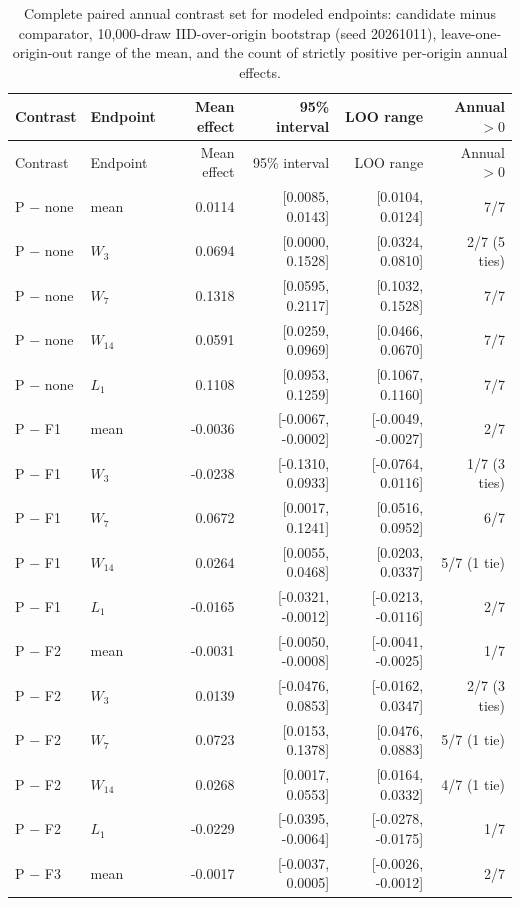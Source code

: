 {\scriptsize
\begin{longtable}{@{}llrrrr@{}}
\caption{Complete paired annual contrast set for modeled endpoints: candidate minus comparator, 10{,}000-draw IID-over-origin bootstrap (seed 20261011), leave-one-origin-out range of the mean, and the count of strictly positive per-origin annual effects.}\label{sup:r2-contrasts}\\
\toprule
Contrast & Endpoint & Mean effect & 95\% interval & LOO range & Annual $>0$ \\
\midrule
\endfirsthead
\toprule
Contrast & Endpoint & Mean effect & 95\% interval & LOO range & Annual $>0$ \\
\midrule
\endhead
\bottomrule
\endlastfoot
P $-$ none & mean & 0.0114 & [0.0085, 0.0143] & [0.0104, 0.0124] & 7/7 \\
P $-$ none & $W_3$ & 0.0694 & [0.0000, 0.1528] & [0.0324, 0.0810] & 2/7 (5 ties) \\
P $-$ none & $W_7$ & 0.1318 & [0.0595, 0.2117] & [0.1032, 0.1528] & 7/7 \\
P $-$ none & $W_{14}$ & 0.0591 & [0.0259, 0.0969] & [0.0466, 0.0670] & 7/7 \\
P $-$ none & $L_1$ & 0.1108 & [0.0953, 0.1259] & [0.1067, 0.1160] & 7/7 \\
P $-$ F1 & mean & -0.0036 & [-0.0067, -0.0002] & [-0.0049, -0.0027] & 2/7 \\
P $-$ F1 & $W_3$ & -0.0238 & [-0.1310, 0.0933] & [-0.0764, 0.0116] & 1/7 (3 ties) \\
P $-$ F1 & $W_7$ & 0.0672 & [0.0017, 0.1241] & [0.0516, 0.0952] & 6/7 \\
P $-$ F1 & $W_{14}$ & 0.0264 & [0.0055, 0.0468] & [0.0203, 0.0337] & 5/7 (1 tie) \\
P $-$ F1 & $L_1$ & -0.0165 & [-0.0321, -0.0012] & [-0.0213, -0.0116] & 2/7 \\
P $-$ F2 & mean & -0.0031 & [-0.0050, -0.0008] & [-0.0041, -0.0025] & 1/7 \\
P $-$ F2 & $W_3$ & 0.0139 & [-0.0476, 0.0853] & [-0.0162, 0.0347] & 2/7 (3 ties) \\
P $-$ F2 & $W_7$ & 0.0723 & [0.0153, 0.1378] & [0.0476, 0.0883] & 5/7 (1 tie) \\
P $-$ F2 & $W_{14}$ & 0.0268 & [0.0017, 0.0553] & [0.0164, 0.0332] & 4/7 (1 tie) \\
P $-$ F2 & $L_1$ & -0.0229 & [-0.0395, -0.0064] & [-0.0278, -0.0175] & 1/7 \\
P $-$ F3 & mean & -0.0017 & [-0.0037, 0.0005] & [-0.0026, -0.0012] & 2/7 \\

\end{longtable}}
